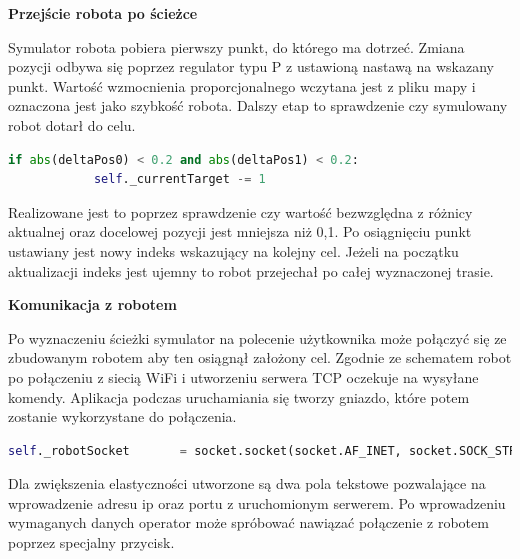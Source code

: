 \textbf{Przejście robota po ścieżce}

Symulator robota pobiera pierwszy punkt, do którego ma dotrzeć. Zmiana pozycji odbywa się poprzez regulator typu P z 
ustawioną nastawą na wskazany punkt. Wartość wzmocnienia proporcjonalnego wczytana jest z pliku mapy i oznaczona jest jako szybkość robota.
Dalszy etap to sprawdzenie czy symulowany robot dotarł do celu. 
\begin{lstlisting}[language=Python,caption=Uruchomienie aplikacji,label={kodPythonSprawdzenieCeluRobota}]
if abs(deltaPos0) < 0.2 and abs(deltaPos1) < 0.2:
            self._currentTarget -= 1
\end{lstlisting}
Realizowane jest to poprzez sprawdzenie czy wartość bezwzględna z różnicy aktualnej oraz docelowej pozycji jest mniejsza niż 0,1.
Po osiągnięciu punkt ustawiany jest nowy indeks wskazujący na kolejny cel.
Jeżeli na początku aktualizacji indeks jest ujemny to robot przejechał po całej wyznaczonej trasie.

\textbf{Komunikacja z robotem}

Po wyznaczeniu ścieżki symulator na polecenie użytkownika może połączyć się ze zbudowanym robotem aby ten osiągnął założony cel.
Zgodnie ze schematem \cite{sch:ogolnyRozwiazania} robot po połączeniu z siecią WiFi i utworzeniu serwera TCP oczekuje na wysyłane komendy.
Aplikacja podczas uruchamiania się tworzy gniazdo, które potem zostanie wykorzystane do połączenia. 
\begin{lstlisting}[language=Python,caption=Utworzone gniazdo,label={kodPythonGniazdo}]
self._robotSocket       = socket.socket(socket.AF_INET, socket.SOCK_STREAM)
\end{lstlisting}
Dla zwiększenia elastyczności utworzone są dwa pola tekstowe pozwalające na wprowadzenie adresu ip oraz portu z uruchomionym serwerem.
Po wprowadzeniu wymaganych danych operator może spróbować nawiązać połączenie z robotem poprzez specjalny przycisk.


